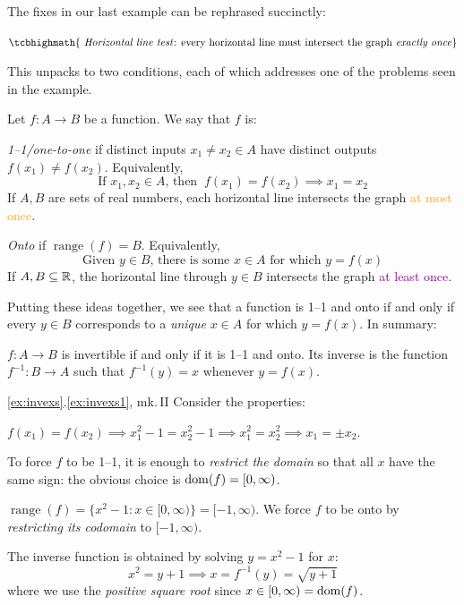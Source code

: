 
The fixes in our last example can be rephrased succinctly:
\begin{center}
$\tcbhighmath{\text{
\emph{Horizontal line test}: every horizontal line must intersect the graph \emph{exactly once}}}$
\end{center}
This unpacks to two conditions, each of which addresses one of the problems seen in the example.

\begin{defn}{}{}
Let $f:A\to B$ be a function. We say that $f$ is:
\begin{enumeratea}
\item \emph{1--1/one-to-one} if distinct inputs $x_1\neq x_2\in A$ have distinct outputs $f(x_1)\neq f(x_2)$. Equivalently,
  \[\text{If $x_1,x_2\in A$, then }\ f(x_1)=f(x_2)\implies x_1=x_2\]
  If $A,B$ are sets of real numbers, each horizontal line intersects the graph \textcolor{orange}{at most once}.
  \item \emph{Onto} if $\operatorname{range}(f)=B$. Equivalently,
  \[\text{Given $y\in B$, there is some $x\in A$ for which $y=f(x)$}\]
  If $A,B\subseteq\mathbb{R}$, the horizontal line through $y\in B$ intersects the graph \textcolor{Purple}{at least once}.
\end{enumeratea}
\end{defn}

Putting these ideas together, we see that a function is 1--1 and onto if and only if every $y\in B$ corresponds to a \emph{unique} $x\in A$ for which $y=f(x)$. In summary:

\begin{thm}{}{}
$f:A\to B$ is invertible if and only if it is 1--1 and onto. Its inverse is the function $f^{-1}:B\to A$ such that $f^{-1}(y)=x$ whenever $y=f(x)$.
\end{thm}


\begin{example*}{\ref*{ex:invexs}.\ref{ex:invexs1}, mk.\,II}{}
Consider the properties:
\begin{enumeratea}
	\item $f(x_1)=f(x_2)\implies x_1^2-1=x_2^2-1\implies x_1^2=x_2^2\implies x_1=\pm x_2$.\par
	To force $f$ to be 1--1, it is enough to \emph{restrict the domain} so that all $x$ have the same sign: the obvious choice is $\operatorname{dom}(f)=[0,\infty)$.
	\item $\operatorname{range}(f)=\{x^2-1:x\in[0,\infty)\}=[-1,\infty)$. We force $f$ to be onto by \emph{restricting its codomain} to $[-1,\infty)$.
\end{enumeratea}
The inverse function is obtained by solving $y=x^2-1$ for $x$:
\[x^2=y+1\implies x=f^{-1}(y)=\sqrt{y+1}\]
where we use the \emph{positive square root} since $x\in[0,\infty)=\operatorname{dom}(f)$.
\end{example*}
\goodbreak


